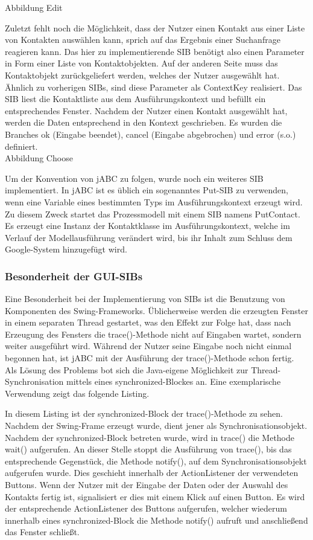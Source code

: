 Abbildung Edit

Zuletzt fehlt noch die Möglichkeit, dass der Nutzer einen Kontakt aus einer Liste von Kontakten auswählen kann, sprich auf das Ergebnis einer Suchanfrage reagieren kann. Das hier zu implementierende SIB benötigt also einen Parameter in Form einer Liste von Kontaktobjekten. Auf der anderen Seite muss das Kontaktobjekt zurückgeliefert werden, welches der Nutzer ausgewählt hat. Ähnlich zu vorherigen SIBs, sind diese Parameter als ContextKey realisiert. Das SIB liest die Kontaktliste aus dem Ausführungskontext und befüllt ein entsprechendes Fenster. Nachdem der Nutzer einen Kontakt ausgewählt hat, werden die Daten entsprechend in den Kontext geschrieben. Es wurden die Branches ok (Eingabe beendet), cancel (Eingabe abgebrochen) und error (s.o.) definiert.\\

Abbildung Choose

Um der Konvention von jABC zu folgen, wurde noch ein weiteres SIB implementiert. In jABC ist es üblich ein sogenanntes Put-SIB zu verwenden, wenn eine Variable eines bestimmten Typs im Ausführungskontext erzeugt wird. Zu diesem Zweck startet das Prozessmodell mit einem SIB namens PutContact. Es erzeugt eine Instanz der Kontaktklasse im Ausführungskontext, welche im Verlauf der Modellausführung verändert wird, bis ihr Inhalt zum Schluss dem Google-System hinzugefügt wird.
	

\subsubsection{Besonderheit der GUI-SIBs}
Eine Besonderheit bei der Implementierung von SIBs ist die Benutzung von Komponenten des Swing-Frameworks. Üblicherweise werden die erzeugten Fenster in einem separaten Thread gestartet, was den Effekt zur Folge hat, dass nach Erzeugung des Fensters die trace()-Methode nicht auf Eingaben wartet, sondern weiter ausgeführt wird. Während der Nutzer seine Eingabe noch nicht einmal begonnen hat, ist jABC mit der Ausführung der trace()-Methode schon fertig.\\

Als Lösung des Problems bot sich die Java-eigene Möglichkeit zur Thread-Synchronisation mittels eines synchronized-Blockes an. Eine exemplarische Verwendung zeigt das folgende Listing.


In diesem Listing ist der synchronized-Block der trace()-Methode zu sehen. Nachdem der Swing-Frame erzeugt wurde, dient jener als Synchronisationsobjekt. Nachdem der synchronized-Block betreten wurde, wird in trace() die Methode wait() aufgerufen. An dieser Stelle stoppt die Ausführung von trace(), bis das entsprechende Gegenstück, die Methode notify(), auf dem Synchronisationsobjekt aufgerufen wurde. Dies geschieht innerhalb der ActionListener der verwendeten Buttons. Wenn der Nutzer mit der Eingabe der Daten oder der Auswahl des Kontakts fertig ist, signalisiert er dies mit einem Klick auf einen Button. Es wird der entsprechende ActionListener des Buttons aufgerufen, welcher wiederum innerhalb eines synchronized-Block die Methode notify() aufruft und anschließend das Fenster schließt.\\

